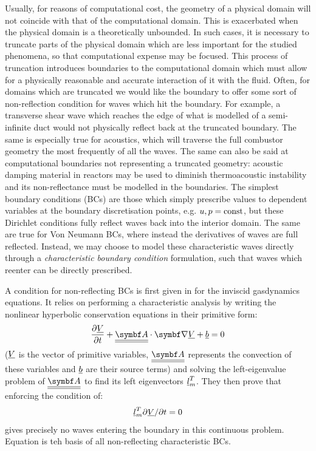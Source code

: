 Usually, for reasons of computational cost, the geometry of a physical domain will not coincide with that of the computational domain. This is exacerbated when the physical domain is a theoretically unbounded. In such cases, it is necessary to truncate parts of the physical domain which are less important for the studied phenomena, so that computational expense may be focused. This process of truncation introduces boundaries to the computational domain which must allow for a physically reasonable and accurate interaction of it with the fluid. Often, for domains which are truncated we would like the boundary to offer some sort of non-reflection condition for waves which hit the boundary. For example, a transverse shear wave which reaches the edge of what is modelled of a semi-infinite duct would not physically reflect back at the truncated boundary. The same is especially true for acoustics, which will traverse the full combustor geometry the most frequently of all the waves. The same can also be said at computational boundaries not representing a truncated geometry: acoustic damping material in reactors may be used to diminish thermoacoustic instability and its non-reflectance must be modelled in the boundaries. The simplest boundary conditions (BCs) are those which simply prescribe values to dependent variables at the boundary discretisation points, e.g. $u, p = \rm {const}$, but these Dirichlet conditions fully reflect waves back into the interior domain. The same are true for Von Neumann BCs, where instead the derivatives of waves are full reflected. Instead, we may choose to model these characteristic waves directly through a \emph{characteristic boundary condition} formulation, such that waves which reenter can be directly prescribed.

A condition for non-reflecting BCs is first given in \cite{hedstrom1979NonreflectingBoundaryConditions} for the inviscid gasdynamics equations. It relies on performing a characteristic analysis by writing the nonlinear hyperbolic conservation equations in their primitive form:
\begin{equation}
\pdv{\und{V}}{t} + \undt{\vb{A}} \cdot \vb{\nabla} \und{V} + \und{b} = 0
\end{equation}
($\und{V}$ is the vector of primitive variables, $\undt{\vb{A}}$ represents the convection of these variables and $\und{b}$ are their source terms) and solving the left-eigenvalue problem of $\undt{\vb{A}}$ to find its left eigenvectors $\und{l}_m^T$. They then prove that enforcing the condition of:
\begin{equation} \label{eqn:nonreflect}
\und{l}_m^T \partial \und{V} / \partial t = 0
\end{equation}
gives precisely no waves entering the boundary in this continuous problem. Equation  is teh basis of all non-reflecting characteristic BCs.


